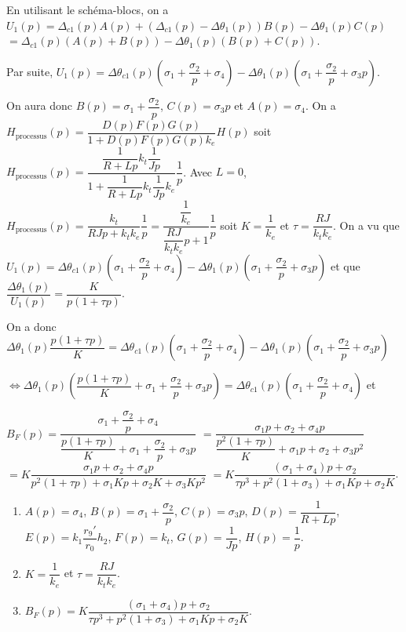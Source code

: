 \begin{corrigebox}
En utilisant le schéma-blocs, on a 
$U_1(p)=\Delta_{c1}(p) A(p) + \left(\Delta_{c1}(p) -\Delta\theta_{1}(p)\right) B(p) - \Delta\theta_{1}(p)C(p)$
$=\Delta_{c1}(p) \left( A(p) + B(p)\right) -\Delta\theta_{1}(p)  \left(B(p)+C(p)\right)$.

Par suite, 
$U_1(p)= \Delta \theta_{c1}(p) \left(\sigma_1 + \dfrac{\sigma_2}{p} +\sigma_4\right) -\Delta \theta_1(p) \left(\sigma_1 + \dfrac{\sigma_2}{p} + \sigma_3p\right)$.

On aura donc $B(p)=\sigma_1 + \dfrac{\sigma_2}{p}$, $C(p)=\sigma_3 p$ et  $A(p)=\sigma_4$.
On a $H_{\text{processus}}(p)= \dfrac{D(p)F(p)G(p)}{1+D(p)F(p)G(p) k_e} H(p)$
soit $H_{\text{processus}}(p)= \dfrac{\dfrac{1}{R+Lp}k_t\dfrac{1}{Jp}}{1+\dfrac{1}{R+Lp}k_t\dfrac{1}{Jp} k_e} \dfrac{1}{p}$.
Avec $L=0$, 
$H_{\text{processus}}(p) =\dfrac{k_t}{RJp+k_t k_e} \dfrac{1}{p}=\dfrac{\dfrac{1}{k_e}}{\dfrac{RJ}{k_t k_e}p+1} \dfrac{1}{p}$ soit $K = \dfrac{1}{k_e}$ et $\tau = \dfrac{RJ}{k_t k_e}$.
On a vu que $U_1(p)= \Delta \theta_{c1}(p) \left(\sigma_1 + \dfrac{\sigma_2}{p} +\sigma_4\right) -\Delta \theta_1(p) \left(\sigma_1 + \dfrac{\sigma_2}{p} + \sigma_3p\right)$ et 
que $\dfrac{\Delta \theta_1(p)}{U_1(p)}=\dfrac{K}{p\left(1+\tau p \right)}$.

On a donc 
$\Delta \theta_1(p) \dfrac{p\left(1+\tau p \right)}{K}= \Delta \theta_{c1}(p) \left(\sigma_1 + \dfrac{\sigma_2}{p} +\sigma_4\right) -\Delta \theta_1(p) \left(\sigma_1 + \dfrac{\sigma_2}{p} + \sigma_3p\right)$

$\Leftrightarrow \Delta \theta_1(p) \left(\dfrac{p\left(1+\tau p \right)}{K}  + \sigma_1 + \dfrac{\sigma_2}{p} + \sigma_3p\right)= \Delta \theta_{c1}(p) \left(\sigma_1 + \dfrac{\sigma_2}{p} +\sigma_4\right) $ et 

$B_F(p) = \dfrac{\sigma_1 + \dfrac{\sigma_2}{p} +\sigma_4}{\dfrac{p\left(1+\tau p \right)}{K}  + \sigma_1 + \dfrac{\sigma_2}{p} + \sigma_3p}$ 
$= \dfrac{\sigma_1 p + \sigma_2 + \sigma_4 p}{\dfrac{p^2\left(1+\tau p \right)}{K}  + \sigma_1p + \sigma_2 + \sigma_3p^2}$
$= K \dfrac{\sigma_1 p + \sigma_2 + \sigma_4 p}{p^2\left(1+\tau p \right)  + \sigma_1 K p + \sigma_2 K  + \sigma_3 Kp^2}$
$= K \dfrac{\left(\sigma_1+ \sigma_4 \right) p + \sigma_2 }{ \tau p^3 + p^2\left(1+\sigma_3 \right)  + \sigma_1 K p + \sigma_2 K  }$.

\begin{enumerate}
\item 
$A(p)=\sigma_4$,
$B(p)=\sigma_1 + \dfrac{\sigma_2}{p}$, 
$C(p)=\sigma_3 p$, 
$D(p) = \dfrac{1}{R+Lp}$, 
$E(p)= k_1 \dfrac{r_9'}{r_0}h_2 $, 
$F(p)=k_t$, 
$G(p)=\dfrac{1}{Jp}$, 
$H(p)=\dfrac{1}{p}$.
\item $K = \dfrac{1}{k_e}$ et $\tau = \dfrac{RJ}{k_t k_e}$.
\item $B_F(p) = K \dfrac{\left(\sigma_1+ \sigma_4 \right) p + \sigma_2 }{ \tau p^3 + p^2\left(1+\sigma_3 \right)  + \sigma_1 K p + \sigma_2 K  }$.
\end{enumerate}
\end{corrigebox}
